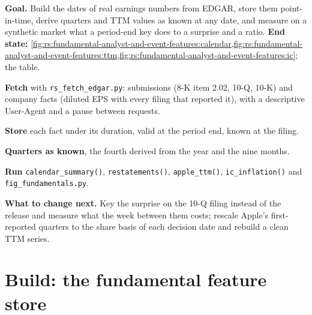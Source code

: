 \begin{tutorial}
\textbf{Goal.} Build the dates of real earnings numbers from EDGAR, store them point-in-time, derive quarters and TTM values as known at
any date, and measure on a synthetic market what a period-end key does to a surprise and a ratio. \textbf{End state:}
\cref{fig:rs:fundamental-analyst-and-event-features:calendar,fig:rs:fundamental-analyst-and-event-features:ttm,fig:rs:fundamental-analyst-and-event-features:ic};
the  table.
\begin{tutsteps}
\item \textbf{Fetch} with \texttt{rs\_fetch\_edgar.py}: submissions (8-K item 2.02, 10-Q, 10-K) and company facts (diluted EPS with every filing
that reported it), with a descriptive User-Agent and a pause between requests.
\item \textbf{Store} each fact under its duration, valid at the period end, known at the filing.
\label{lst:rs:fundamental-analyst-and-event-features:load}
\item \textbf{Quarters as known}, the fourth derived from the year and the nine months.
\label{lst:rs:fundamental-analyst-and-event-features:quarterly}
\item \textbf{Run} \texttt{calendar\_summary()}, \texttt{restatements()}, \texttt{apple\_ttm()}, \texttt{ic\_inflation()} and
\texttt{fig\_fundamentals.py}.
\end{tutsteps}
\textbf{What to change next.} Key the surprise on the 10-Q filing instead of the release and measure what the week between them costs;
rescale Apple's first-reported quarters to the share basis of each decision date and rebuild a clean TTM series.
\end{tutorial}

\section{Build: the fundamental feature store}\label{bld:rs:fundamental-analyst-and-event-features:fundpit}

